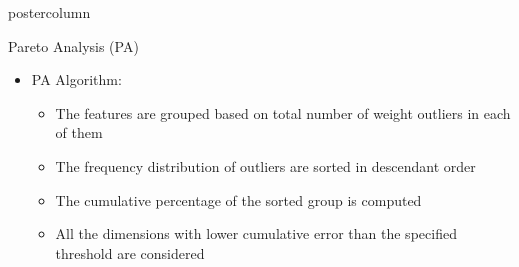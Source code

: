 \documentclass[final]{beamer}
\newlength{\columnheight}
\begin{document}
\begin{frame}
\begin{columns}
    \begin{column}{.49\textwidth}
      \begin{beamercolorbox}[center,wd=\textwidth]{postercolumn}
        \begin{minipage}[T]{.95\textwidth} %
          \parbox[t][\columnheight]{\textwidth}{ %
			\begin{block}{Pareto Analysis (PA)}
			\begin{itemize}		
			\item PA Algorithm: 
          		\begin{itemize}
          			\item The features are grouped based on total number of weight outliers in each of them 
          			\item The frequency distribution of outliers are sorted in descendant order
          			\item The cumulative percentage of the sorted group is computed
          			\item All the dimensions with lower cumulative error than the specified threshold are considered
          		\end{itemize}
          			
			\end{itemize}
			

\end{block}}
\end{minipage}
\end{beamercolorbox}
\end{column}
\end{columns}
\end{frame}
\end{document}
